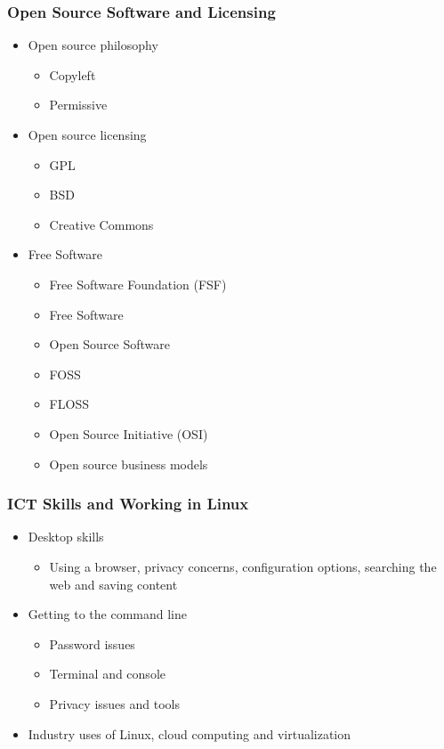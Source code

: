\documentclass{beamer}
\newcommand{\copyleft}{\reflectbox{\copyright}}
\begin{document}
	\begin{frame}
		\frametitle{Open Source Software and Licensing}
		\begin{itemize}
			\pause
			\item Open source philosophy
			\begin{itemize}
				\pause
				\item Copyleft \copyleft
				\pause
				\item Permissive
			\end{itemize}

			\pause
			\item Open source licensing
			\begin{itemize}
				\pause
				\item GPL
				\pause
				\item BSD
				\pause
				\item Creative Commons
			\end{itemize}

			\pause
			\item Free Software
			\begin{itemize}
				\pause
				\item Free Software Foundation (FSF)
				\pause
				\item Free Software
				\pause
				\item Open Source Software
				\pause
				\item FOSS
				\pause
				\item FLOSS
				\pause
				\item Open Source Initiative (OSI)
				\pause
				\item Open source business models
			\end{itemize}
		\end{itemize}
	\end{frame}

	\begin{frame}
		\frametitle{ICT Skills and Working in Linux}
		\begin{itemize}
			\pause
			\item Desktop skills
			\begin{itemize}
				\pause
				\item Using a browser, privacy concerns, configuration options, searching the web and saving content
			\end{itemize}

			\pause
			\item Getting to the command line
			\begin{itemize}
				\pause
				\item Password issues
				\pause
				\item Terminal and console
				\pause
				\item Privacy issues and tools
			\end{itemize}

			\pause
			\item Industry uses of Linux, cloud computing and virtualization
		\end{itemize}
	\end{frame}
\end{document}
